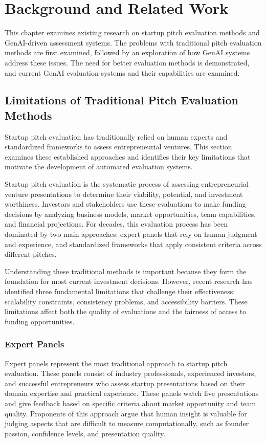 \chapter{Background and Related Work}
\label{ch:soa}
This chapter examines existing research on startup pitch evaluation methods and GenAI-driven assessment systems. The problems with traditional pitch evaluation methods are first examined, followed by an exploration of how GenAI systems address these issues. The need for better evaluation methods is demonstrated, and current GenAI evaluation systems and their capabilities are examined.

\section{Limitations of Traditional Pitch Evaluation Methods}
\label{sec:traditional-methods}

Startup pitch evaluation has traditionally relied on human experts and standardized frameworks to assess entrepreneurial ventures. This section examines these established approaches and identifies their key limitations that motivate the development of automated evaluation systems.

Startup pitch evaluation is the systematic process of assessing entrepreneurial venture presentations to determine their viability, potential, and investment worthiness. Investors and stakeholders use these evaluations to make funding decisions by analyzing business models, market opportunities, team capabilities, and financial projections. For decades, this evaluation process has been dominated by two main approaches: expert panels that rely on human judgment and experience, and standardized frameworks that apply consistent criteria across different pitches.

Understanding these traditional methods is important because they form the foundation for most current investment decisions. However, recent research has identified three fundamental limitations that challenge their effectiveness: scalability constraints, consistency problems, and accessibility barriers. These limitations affect both the quality of evaluations and the fairness of access to funding opportunities.

\subsection{Expert Panels}\label{subsec:expert-panels}

Expert panels represent the most traditional approach to startup pitch evaluation. These panels consist of industry professionals, experienced investors, and successful entrepreneurs who assess startup presentations based on their domain expertise and practical experience. These panels watch live presentations and give feedback based on specific criteria about market opportunity and team quality. Proponents of this approach argue that human insight is valuable for judging aspects that are difficult to measure computationally, such as founder passion, confidence levels, and presentation quality.

